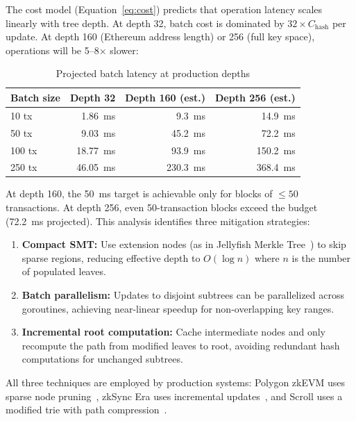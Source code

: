 The cost model (Equation~\ref{eq:cost}) predicts that operation
latency scales linearly with tree depth. At depth 32, batch cost is
dominated by $32 \times C_{\text{hash}}$ per update. At depth 160
(Ethereum address length) or 256 (full key space), operations will
be 5--8$\times$ slower:

\begin{table}[h]
\centering
\caption{Projected batch latency at production depths}
\label{tab:depth-projection}
\begin{tabular}{lrrr}
\toprule
\textbf{Batch size} & \textbf{Depth 32} & \textbf{Depth 160 (est.)} & \textbf{Depth 256 (est.)} \\
\midrule
10 tx  & 1.86~ms  & 9.3~ms   & 14.9~ms \\
50 tx  & 9.03~ms  & 45.2~ms  & 72.2~ms \\
100 tx & 18.77~ms & 93.9~ms  & 150.2~ms \\
250 tx & 46.05~ms & 230.3~ms & 368.4~ms \\
\bottomrule
\end{tabular}
\end{table}

At depth 160, the 50~ms target is achievable only for blocks of
$\leq 50$ transactions. At depth 256, even 50-transaction blocks
exceed the budget (72.2~ms projected). This analysis identifies
three mitigation strategies:

\begin{enumerate}
  \item \textbf{Compact SMT:} Use extension nodes (as in Jellyfish
    Merkle Tree~\cite{aptos2024jellyfish}) to skip sparse regions,
    reducing effective depth to $O(\log n)$ where $n$ is the number
    of populated leaves.
  \item \textbf{Batch parallelism:} Updates to disjoint subtrees
    can be parallelized across goroutines, achieving near-linear
    speedup for non-overlapping key ranges.
  \item \textbf{Incremental root computation:} Cache intermediate
    nodes and only recompute the path from modified leaves to root,
    avoiding redundant hash computations for unchanged subtrees.
\end{enumerate}

All three techniques are employed by production systems: Polygon
zkEVM uses sparse node pruning~\cite{polygon2024zkprover}, zkSync
Era uses incremental updates~\cite{zksync2024boojum}, and Scroll
uses a modified trie with path compression~\cite{scroll2024architecture}.

